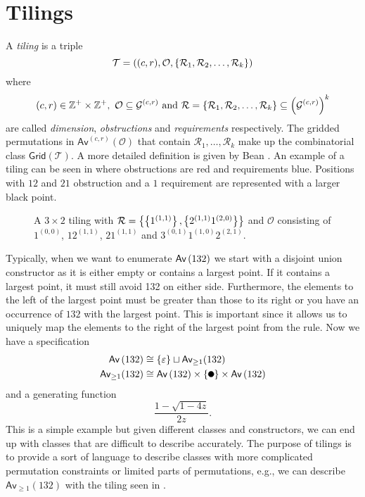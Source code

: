 \section{Tilings\label{sec:tilings}}
A \emph{tiling} is a triple
\[
\mathcal{T} = ((c,r), \mathcal{O}, \left\{\mathcal{R}_1,\mathcal{R}_2,\dotsc,\mathcal{R}_k\right\})
\]
where
\[
    (c,r) \in \mathbb{Z}^+ \times \mathbb{Z}^+, \ \mathcal{O} \subseteq \mathcal{G}^{(c,r)} \text{ and } \mathcal{R}=\left\{\mathcal{R}_1,\mathcal{R}_2,\dotsc,\mathcal{R}_k\right\} \subseteq \left(\mathcal{G}^{(c,r)}\right)^k
\]
are called \emph{dimension}, \emph{obstructions} and \emph{requirements} respectively. The gridded permutations in $\textsf{Av}^{(c,r)}\left(\mathcal{O}\right)$ that contain $\mathcal{R}_1,\dotsc,\mathcal{R}_k$ make up the combinatorial class $\textsf{Grid}(\mathcal{T})$. A more detailed definition is given by Bean \cite{BeanPhd:phd}. An example of a tiling can be seen in  where obstructions are red and requirements blue. Positions with $12$ and $21$ obstruction and a $1$ requirement are represented with a larger black point.

\begin{figure}[ht!]
    \centering
    
    \caption{A $3 \times 2$ tiling with $\mathcal{R} = \left\{\left\{1^{(1,1)}\right\}, \left\{2^{(1,1)}1^{(2,0)}\right\}\right\}$ and $\mathcal{O}$ consisting of $1^{(0,0)}$, $12^{(1,1)}$, $21^{(1,1)}$ and $3^{(0,1)}1^{(1,0)}2^{(2,1)}$.}
    \label{fig:tiling_example}
\end{figure}

Typically, when we want to enumerate $\textsf{Av}\left(132\right)$ we start with a disjoint union constructor as it is either empty or contains a largest point. If it contains a largest point, it must still avoid 132 on either side. Furthermore, the elements to the left of the largest point must be greater than those to its right or you have an occurrence of $132$ with the largest point. This is important since it allows us to uniquely map the elements to the right of the largest point from the rule. Now we have a specification
\begin{align*}
\Av{132} &\cong \set{\varepsilon} \sqcup \textsf{Av}_{\geq1}(132)\\
\textsf{Av}_{\geq1}(132) &\cong \Av{132} \times \set{\point{0.1}} \times \Av{132}
\end{align*}
and a generating function
\[
\frac{1-\sqrt{1-4z}}{2z}.
\]
This is a simple example but given different classes and constructors, we can end up with classes that are difficult to describe accurately. The purpose of tilings is to provide a sort of language to describe classes with more complicated permutation constraints or limited parts of permutations, e.g., we can describe $\textsf{Av}_{\geq1}(132)$ with the tiling seen in .

